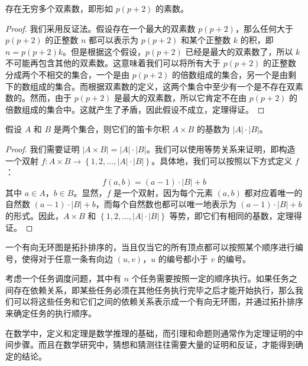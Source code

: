 \begin{conj}
  存在无穷多个双素数，即形如 $p(p+2)$ 的素数。
\end{conj}

\begin{proof}
  我们采用反证法。假设存在一个最大的双素数 $p(p+2)$，那么任何大于 $p(p+2)$ 的正整数 $n$ 都可以表示为 $p(p+2)$ 和某个正整数 $k$ 的积，即 $n = p(p+2)k$。但是根据这个假设，$p(p+2)$ 已经是最大的双素数了，所以 $k$ 不可能再包含其他的双素数。这意味着我们可以将所有大于 $p(p+2)$ 的正整数分成两个不相交的集合，一个是由 $p(p+2)$ 的倍数组成的集合，另一个是由剩下的数组成的集合。而根据双素数的定义，这两个集合中至少有一个是不存在双素数的。然而，由于 $p(p+2)$ 是最大的双素数，所以它肯定不在由 $p(p+2)$ 的倍数组成的集合中。这就产生了矛盾，因此假设不成立，定理得证。
\end{proof}

\begin{assume}
  假设 $A$ 和 $B$ 是两个集合，则它们的笛卡尔积 $A \times B$ 的基数为 $|A| \cdot |B|$。
\end{assume}

\begin{proof}
  我们需要证明 $|A \times B| = |A| \cdot |B|$。我们可以使用等势关系来证明，即构造一个双射 $f: A \times B \rightarrow \left\{1,2,\dots,|A| \cdot |B|\right\}$。具体地，我们可以按照以下方式定义 $f$：
  \begin{equation}
    f(a,b)=(a-1)\cdot |B|+b
  \end{equation}
  其中 $a \in A$，$b \in B$。显然，$f$ 是一个双射，因为每个元素 $(a,b)$ 都对应着唯一的自然数 $(a-1) \cdot |B| + b$，而每个自然数也都可以唯一地表示为 $(a-1) \cdot |B| + b$ 的形式。因此，$A \times B$ 和 $\left\{1,2,\dots,|A| \cdot |B|\right\}$ 等势，即它们有相同的基数，定理得证。
\end{proof}

\begin{dfn}
  一个有向无环图是拓扑排序的，当且仅当它的所有顶点都可以按照某个顺序进行编号，使得对于任意一条有向边 $(u,v)$，$u$ 的编号都小于 $v$ 的编号。
\end{dfn}

\begin{exmp}
  考虑一个任务调度问题，其中有 $n$ 个任务需要按照一定的顺序执行。如果任务之间存在依赖关系，即某些任务必须在其他任务执行完毕之后才能开始执行，那么我们可以将这些任务和它们之间的依赖关系表示成一个有向无环图，并通过拓扑排序来确定任务的执行顺序。
\end{exmp}

\begin{rem}
  在数学中，定义和定理是数学推理的基础，而引理和命题则通常作为定理证明的中间步骤。而且在数学研究中，猜想和猜测往往需要大量的证明和反证，才能得到确定的结论。
\end{rem}

